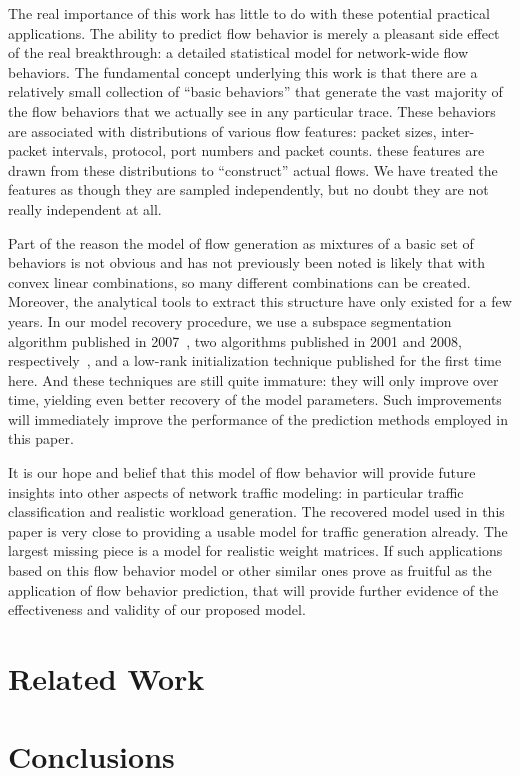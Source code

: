 \documentclass[conference]{IEEEtran}
\begin{document}
The real importance of this work has little to do with these potential practical applications.
The ability to predict flow behavior is merely a pleasant side effect of the real breakthrough:
a detailed statistical model for network-wide flow behaviors.
The fundamental concept underlying this work is that there are a relatively small collection of ``basic behaviors'' that generate the vast majority of the flow behaviors that we actually see in any particular trace.
These behaviors are associated with distributions of various flow features:
packet sizes, inter-packet intervals,  protocol, port numbers and packet counts.
these features are drawn from these distributions to ``construct'' actual flows.
We have treated the features as though they are sampled independently, but no doubt they are not really independent at all.

Part of the reason the model of flow generation as mixtures of a basic set of behaviors is not obvious and has not previously been noted is likely that with convex linear combinations, so many different combinations can be created.
Moreover, the analytical tools to extract this structure have only existed for a few years.
In our model recovery procedure, we use a subspace segmentation algorithm published in 2007~\cite{Ma07}, two  algorithms published in 2001 and 2008, respectively~\cite{Lee01,Kim08:anls}, and a low-rank  initialization technique published for the first time here.
And these techniques are still quite immature:
they will only improve over time, yielding even better recovery of the model parameters.
Such improvements will immediately improve the performance of the prediction methods employed in this paper.

It is our hope and belief that this model of flow behavior will provide future insights into other aspects of network traffic modeling:
in particular traffic classification and realistic workload generation.
The recovered model used in this paper is very close to providing a usable model for traffic generation already.
The largest missing piece is a model for realistic weight matrices.
If such applications based on this flow behavior model or other similar ones prove as fruitful as the application of flow behavior prediction, that will provide further evidence of the effectiveness and validity of our proposed model.


\section{Related Work}

\section{Conclusions}


\end{document}
